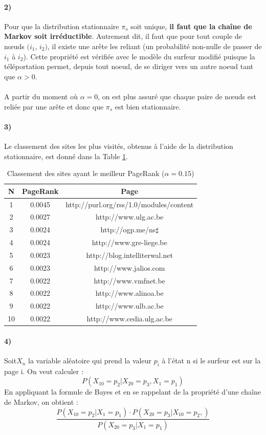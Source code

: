 \documentclass[a4paper,titlepage]{report}
\begin{document}
\paragraph{2)}
Pour que la distribution stationnaire $\pi_s$ soit unique, \textbf{il faut que la chaîne de Markov soit irréductible}. Autrement dit, il faut que pour tout couple de nœuds $(i_1$, $i_2)$, il existe une arête les reliant (un probabilité non-nulle de passer de $i_1$ à $i_2$). Cette propriété est vérifiée avec le modèle du surfeur modifié puisque la téléportation permet, depuis tout noeud, de se diriger vers un autre noeud tant que $\alpha > 0$. 
\paragraph{}
A partir du moment où $\alpha = 0$, on est plus assuré que chaque paire de nœuds est reliée par une arête et donc que $\pi_s$ est bien stationnaire.
\paragraph{3)} 
Le classement des sites les plus visités, obtenus à l'aide de la distribution stationnaire, est donné dans la Table \ref{tab:best_page_rank}.
\begin{table}[h]
	\center
	\begin{tabular}{|c|c|c|}
		\hline
		N\degre & PageRank & Page \\
		\hline
		1 & 0.0045 & http://purl.org/rss/1.0/modules/content \\
		2 & 0.0027 & http://www.ulg.ac.be \\
		3 & 0.0024 & http://ogp.me/ns$\sharp$ \\
		4 & 0.0024 & http://www.gre-liege.be  \\
		5 & 0.0023 & http://blog.intelliterwal.net  \\
		6 & 0.0023 & http://www.jalios.com  \\
		7 & 0.0022 & http://www.vmfnet.be  \\
		8 & 0.0022 & http://www.alinoa.be  \\
		9 & 0.0022 & http://www.ulb.ac.be  \\
		10 & 0.0022 & http://www.cedia.ulg.ac.be  \\
		\hline
	\end{tabular}
	\caption{Classement des sites ayant le meilleur PageRank ($\alpha = 0.15$)}
	\label{tab:best_page_rank}
\end{table}
\paragraph{4)}
Soit$ X_n$ la variable aléatoire qui prend la valeur $p_i$ à l'état n si le surfeur est sur la page i.
On veut calculer : $$
P(X_{10} = p_2 | X_{20} = p_3 , X_1 = p_1)
$$
En appliquant la formule de Bayes et en se rappelant de la propriété d'une chaîne de Markov, on obtient :
$$ \dfrac{P(X_{10} = p_2 | X_1 = p_1) \cdot P(X_{20} = p_3 | X_{10} = p_2,)}{P(X_{20} = p_3 | X_1 = p_1)} $$
\end{document}
